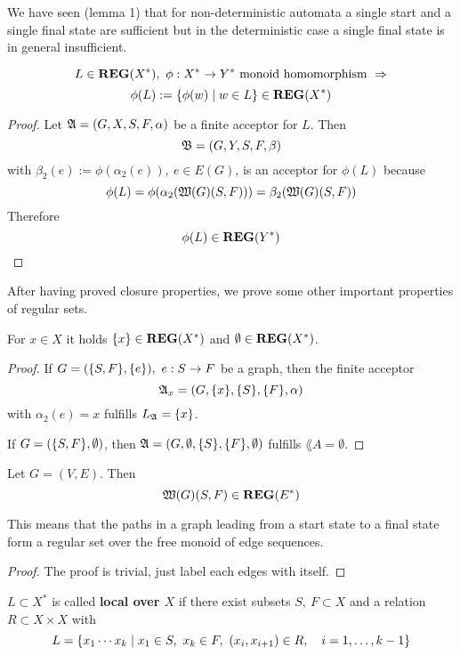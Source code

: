 We have seen (lemma 1) that for non-deterministic automata a single start and a
single final state are sufficient but in the deterministic case a single final
state is in general insufficient.

\bigskip
\begin{theorem}
\[ L \in \mbox{{\bf REG}}(X^*),\ \phi : X^* \to Y^* \mbox{ monoid homomorphism }
\Rightarrow \]
\[ \phi(L) := \mbox{$\{\phi(w) \mid w \in L\}$} \in \mbox{{\bf REG}}(X^*) \]
\end{theorem}
\begin{proof}
Let $\mbox{$\mathfrak{A}$} = (G, X, S, F, \alpha)$ be a finite acceptor for $L$. Then \[
\mbox{$\mathfrak{B}$} = (G, Y, S, F, \beta)\] with $\beta_2(e) := \phi(\alpha_2(e)),\ e \in
E(G)$, is an acceptor for $\phi(L)$ because \[\phi(L) =
\phi(\alpha_2(\mbox{$\mathfrak{W}({G})$}(S, F))) = \beta_2(\mbox{$\mathfrak{W}({G})$}(S,F))\]
Therefore \[ \phi(L) \in \mbox{{\bf REG}}(Y^*) \]
\end{proof}

After having proved closure properties, we prove some other important properties
of regular sets.

\begin{lemma}
For $x \in X$ it holds $\mbox{$\{x\}$} \in \mbox{{\bf REG}}(X^*)$ and $\emptyset \in \mbox{{\bf REG}}(X^*)$.
\end{lemma}
\begin{proof}
If $G = (\mbox{$\{S,F\}$}, \mbox{$\{e\}$}),\ e: S \to F$ be a graph, then the finite
acceptor \[\mbox{$\mathfrak{A}$}_x = (G, \mbox{$\{x\}$}, \mbox{$\{S\}$}, \mbox{$\{F\}$}, \alpha)\] with $\alpha_2(e) =
x$ fulfills $\mbox{$L_{\mathfrak{A}}$} = \mbox{$\{x\}$}$.

If $G = (\mbox{$\{S,F\}$}, \emptyset)$, then $\mbox{$\mathfrak{A}$} = (G, \emptyset, \mbox{$\{S\}$},
\mbox{$\{F\}$}, \emptyset)$ fulfills $\lang{A} = \emptyset$.
\end{proof}

\bigskip
\begin{lemma}
Let $G = (V, E)$. Then \[ \mbox{$\mathfrak{W}({G})$}(S,F) \in \mbox{{\bf REG}}(E^*) \]
\end{lemma}
This means that the paths in a graph leading from a start state to a final state
form a regular set over the free monoid of edge sequences. 
\begin{proof}
The proof is trivial, just label each edges with itself.
\end{proof}

\bigskip
\begin{definition}
$L \subset X^*$ is called {\bf local over $X$} if there exist subsets $S,\ F
\subset X$ and a relation $R \subset X \times X$ with 
\[ L = \mbox{$\{x_1 \cdots x_k \mid x_1 \in S,\ x_k \in F,\ (x_i, x_{i+1}) \in R,
\quad i = 1, \ldots, k - 1\}$} \]
\end{definition}

